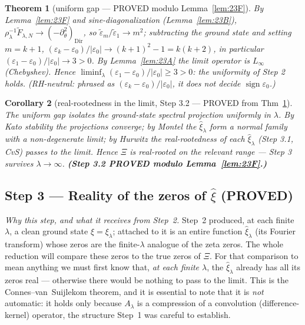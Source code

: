 \documentclass[11pt]{amsart}
\newtheorem{theorem}{Theorem}[section]
\newtheorem{corollary}[theorem]{Corollary}
\theoremstyle{definition}
\theoremstyle{remark}
\newcommand{\ve}{\varepsilon}
\newcommand{\PROVED}{\textbf{(PROVED)}}
\begin{document}
\begin{theorem}[uniform gap --- PROVED modulo Lemma~\ref{lem:23F}]\label{thm:23}
By Lemma~\ref{lem:23F} and sine-diagonalization (Lemma~\ref{lem:23B}),
$\rho_\lambda^{-1}\widetilde F_{\lambda,N}\to(-\partial_\theta^2)_{\mathrm{Dir}}$, so
$\widetilde\ve_m/\widetilde\ve_1\to m^2$; subtracting the ground state and setting $m=k+1$,
$(\ve_k-\ve_0)/|\ve_0|\to(k+1)^2-1=k(k+2)$, in particular
$(\ve_1-\ve_0)/|\ve_0|\to3>0$. By Lemma~\ref{lem:23A} the limit operator is $L_\infty$
(Chebyshev). Hence $\liminf_\lambda(\ve_1-\ve_0)/|\ve_0|\ge3>0$: the uniformity of Step 2
holds. (RH-neutral: phrased as $(\ve_k-\ve_0)/|\ve_0|$, it does not decide $\operatorname{sign}\ve_0$.)
\end{theorem}
\begin{corollary}[real-rootedness in the limit, Step 3.2 --- PROVED from Thm~\ref{thm:23}]\label{cor:23G}
The uniform gap isolates the ground-state spectral projection uniformly in $\lambda$. By
Kato stability the projections converge; by Montel the $\hat\xi_\lambda$ form a normal
family with a non-degenerate limit; by Hurwitz the real-rootedness of each $\hat\xi_\lambda$
(Step 3.1, CvS) passes to the limit. Hence $\Xi$ is real-rooted on the relevant range ---
Step 3 survives $\lambda\to\infty$. \textbf{(Step 3.2 PROVED modulo Lemma~\ref{lem:23F}.)}
\end{corollary}

\subsection{Step 3 --- Reality of the zeros of $\hat\xi$ \PROVED}

\emph{Why this step, and what it receives from Step~2.} Step~2 produced, at each finite
$\lambda$, a clean ground state $\xi=\xi_\lambda$; attached to it is an entire function
$\hat\xi_\lambda$ (its Fourier transform) whose zeros are the finite-$\lambda$ analogue of the
zeta zeros. The whole reduction will compare these zeros to the true zeros of $\Xi$. For that
comparison to mean anything we must first know that, \emph{at each finite $\lambda$}, the
$\hat\xi_\lambda$ already has all its zeros real --- otherwise there would be nothing to pass to
the limit. This is the Connes--van~Suijlekom theorem, and it is essential to note that it is
\emph{not} automatic: it holds only because $A_\lambda$ is a compression of a convolution
(difference-kernel) operator, the structure Step~1 was careful to establish.
\end{document}
